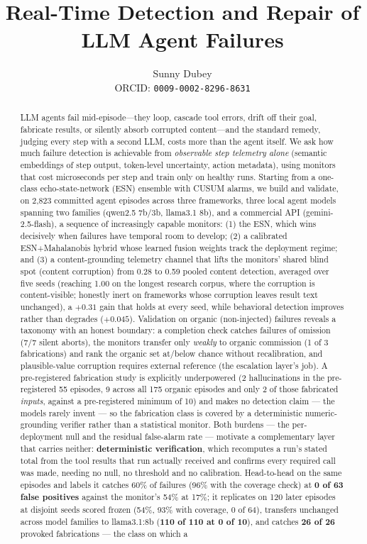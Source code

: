 \documentclass{article}
\title{Real-Time Detection and Repair of LLM Agent Failures}
\author{
  Sunny Dubey \\
  ORCID: \texttt{0009-0002-8296-8631} \\
}
\begin{document}
\maketitle

\begin{abstract}
LLM agents fail mid-episode---they loop, cascade tool errors, drift off their goal, fabricate results, or silently absorb corrupted content---and the standard remedy, judging every step with a second LLM, costs more than the agent itself. We ask how much failure detection is achievable from \textit{observable step telemetry alone} (semantic embeddings of step output, token-level uncertainty, action metadata), using monitors that cost microseconds per step and train only on healthy runs. Starting from a one-class echo-state-network (ESN) ensemble with CUSUM alarms, we build and validate, on 2,823 committed agent episodes across three frameworks, three local agent models spanning two families (qwen2.5 7b/3b, llama3.1 8b), and a commercial API (gemini-2.5-flash), a sequence of increasingly capable monitors: (1) the ESN, which wins decisively when failures have temporal room to develop; (2) a calibrated ESN+Mahalanobis hybrid whose learned fusion weights track the deployment regime; and (3) a content-grounding telemetry channel that lifts the monitors' shared blind spot (content corruption) from 0.28 to 0.59 pooled content detection, averaged over five seeds (reaching 1.00 on the longest research corpus, where the corruption is content-visible; honestly inert on frameworks whose corruption leaves result text unchanged), a $+0.31$ gain that holds at every seed, while behavioral detection improves rather than degrades ($+0.045$). Validation on organic (non-injected) failures reveals a taxonomy with an honest boundary: a completion check catches failures of omission (7/7 silent aborts), the monitors transfer only \emph{weakly} to organic commission (1 of 3 fabrications) and rank the organic set at/below chance without recalibration, and plausible-value corruption requires external reference (the escalation layer's job). A pre-registered fabrication study is explicitly underpowered (2 hallucinations in the pre-registered 55 episodes, 9 across all 175 organic episodes and only 2 of those fabricated \emph{inputs}, against a pre-registered minimum of 10) and makes no detection claim --- the models rarely invent --- so the fabrication class is covered by a deterministic numeric-grounding verifier rather than a statistical monitor. Both burdens --- the per-deployment null and the residual false-alarm rate --- motivate a complementary layer that carries neither: \textbf{deterministic verification}, which recomputes a run's stated total from the tool results that run actually received and confirms every required call was made, needing no null, no threshold and no calibration. Head-to-head on the same episodes and labels it catches 60\% of failures (96\% with the coverage check) at \textbf{0 of 63 false positives} against the monitor's 54\% at 17\%; it replicates on 120 later episodes at disjoint seeds scored frozen (54\%, 93\% with coverage, 0 of 64), transfers unchanged across model families to llama3.1:8b (\textbf{110 of 110 at 0 of 10}), and catches \textbf{26 of 26} provoked fabrications --- the class on which a 
\end{abstract}
\end{document}
